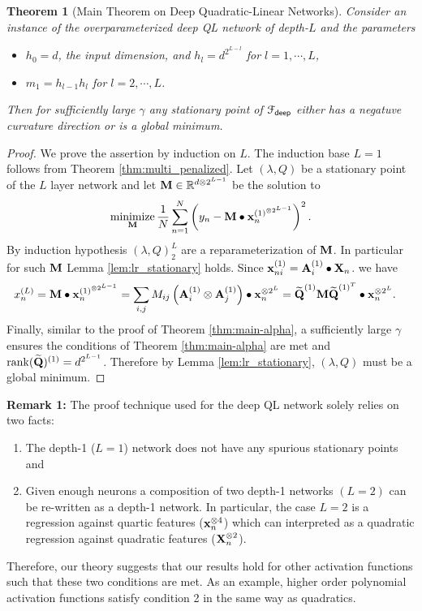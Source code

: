 \documentclass[11pt]{article}
\theoremstyle{plain}
\newtheorem{theorem}{Theorem}
\DeclareMathOperator*{\minimize}{minimize}
\DeclareMathOperator*{\rank}{rank}
\def\R{\mathbb{R}}
\theoremstyle{plain}
\numberwithin{equation}{section}
\numberwithin{lemma}{section}
\numberwithin{theorem}{section}
\numberwithin{corollary}{section}
\numberwithin{observation}{section}
\numberwithin{definition}{section}
\numberwithin{example}{section}
\begin{document}
\begin{theorem}[Main Theorem on Deep Quadratic-Linear Networks] \label{thm:main_deep} 
Consider an instance of the overparameterized deep QL network of depth-$L$ and the parameters
    \begin{itemize}
    \item $h_0= d$, the input dimension, and $h_l = d^{2^{L-l}}$ for $l=1,\cdots,L$,
    \item $m_1 = h_{l-1} h_l$ for $l=2,\cdots,L$.
\end{itemize}
Then for sufficiently large $\gamma$ any stationary point of $\mathcal{F}_{\sf deep}$ either has a negatuve curvature direction or is a global minimum.
\end{theorem}
\begin{proof} We prove the assertion by induction on $L$. The induction base $L=1$ follows from Theorem \ref{thm:multi_penalized}. Let $(\lambda,Q)$ be a stationary point of the $L$ layer network and let $\Mx{M} \in \R^{d \otimes 2^{L-1}}$ be the solution to 
\begin{equation}
    \minimize_{\Mx{M}} \frac{1}{N} \sum_{n=1}^{N} \left(y_n - \Mx{M}\bullet \V{x}^{(1)^{\otimes 2^{L-1}}}_n \right)^2.
\end{equation}
By induction hypothesis $(\lambda,Q)_{2}^L$ are a reparameterization of $\Mx{M}$. In particular for such $\Mx{M}$ Lemma \ref{lem:lr_stationary} holds. Since $\V{x}_{ni}^{(1)} = \Mx{A}_i^{(1)} \bullet \Mx{X}_n$.
we have
\begin{align}
    x_{n}^{(L)} & =  \Mx{M} \bullet \V{x}^{(1)^{\otimes 2^{L-1}}}_n = \sum_{i,j} M_{ij} \left( \Mx{A}_i^{(1)} \otimes \Mx{A}_j^{(1)} \right) \bullet  \V{x}^{{\otimes 2^{L}}}_n = \widetilde{\Mx{Q}}^{(1)}\Mx{M}\widetilde{\Mx{Q}}^{(1)^T} \bullet  \V{x}^{{\otimes 2^{L}}}_n.
\end{align}
Finally, similar to the proof of Theorem \ref{thm:main-alpha}, a sufficiently large $\gamma$ ensures the conditions of Theorem \ref{thm:main-alpha} are met and $\rank(\widetilde{\Mx{Q}})^{(1)} = d^{2^{L-1}}$. Therefore by Lemma \ref{lem:lr_stationary}, $(\lambda,Q)$ must be a global minimum.
\end{proof}

\textbf{Remark 1:} The proof technique used for the deep QL network solely relies on two facts:
\begin{enumerate}
    \item The depth-1 ($L=1$) network does not have any spurious stationary points and
    \item Given enough neurons a composition of two depth-1 networks $(L=2)$ can be re-written as a depth-1 network. In particular, the case $L=2$ is a regression against quartic features ($\V{x}_n^{\otimes 4}$) which can  interpreted as a quadratic regression against quadratic features ($\Mx{X}_n^{\otimes 2}$).
\end{enumerate}
Therefore, our theory suggests that our results hold for other activation functions such that these two conditions are met. As an example, higher order polynomial activation functions satisfy condition 2 in the same way as quadratics. 
\end{document}
